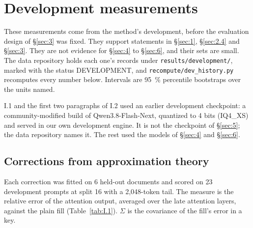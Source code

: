 \documentclass[11pt]{article}
\begin{document}
\section{Development measurements}\label{app:I}
These measurements come from the method's development, before the evaluation design of \S\ref{sec:3} was fixed. They support statements in \S\ref{sec:1}, \S\ref{sec:2.4} and \S\ref{sec:3}. They are not evidence for \S\ref{sec:4} to \S\ref{sec:6}, and their sets are small. The data repository holds each one's records under \texttt{results/\allowbreak{}development/\allowbreak{}}, marked with the status DEVELOPMENT, and \texttt{recompute/\allowbreak{}dev\_\allowbreak{}history.\allowbreak{}py} recomputes every number below. Intervals are 95~\% percentile bootstraps over the units named.

I.1 and the first two paragraphs of I.2 used an earlier development checkpoint: a community-modified build of Qwen3.8-Flash-Next, quantized to 4 bits (IQ4\_XS) and served in our own development engine. It is not the checkpoint of \S\ref{sec:5}; the data repository names it. The rest used the models of \S\ref{sec:4} and \S\ref{sec:6}.


\subsection{Corrections from approximation theory}\label{sec:I.1}
Each correction was fitted on 6 held-out documents and scored on 23 development prompts at split 16 with a 2,048-token tail. The measure is the relative error of the attention output, averaged over the late attention layers, against the plain fill (Table~\ref{tab:I.1}). $\Sigma$ is the covariance of the fill's error in a key.
\end{document}
